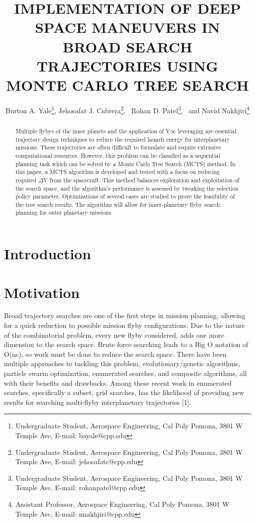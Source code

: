 \documentclass[letterpaper, preprint, paper,11pt]{AAS}	%
\begin{document}
\title{IMPLEMENTATION OF DEEP SPACE MANEUVERS IN BROAD SEARCH TRAJECTORIES USING MONTE CARLO TREE SEARCH}

\author{Burton A. Yale\thanks{Undergraduate Student, Aerospace Engineering, Cal Poly Pomona, 3801 W Temple Ave, E-mail: bayale@cpp.edu},  
Jehosafat J. Cabrera\thanks{Undergraduate Student, Aerospace Engineering, Cal Poly Pomona, 3801 W Temple Ave, E-mail: jehosafatc@cpp.edu},
\ Rohan D. Patel\thanks{Undergraduate Student, Aerospace Engineering, Cal Poly Pomona, 3801 W Temple Ave, E-mail: rohanpatel@cpp.edu},
\ and Navid Nakhjiri\thanks{Assistant Professor, Aerospace Engineering, Cal Poly Pomona, 3801 W Temple Ave, E-mail: nnakhjiri@cpp.edu}
}


\maketitle{} 		


\begin{abstract}
Multiple flybys of the inner planets and the application of V$\infty$ leveraging are essential trajectory design techniques to reduce the required launch energy for interplanetary missions. These trajectories are often difficult to formulate and require extensive computational resources. However, this problem can be classified as a sequential planning task which can be solved by a Monte Carlo Tree Search (MCTS) method. In this paper, a MCTS algorithm is developed and tested with a focus on reducing required $\Delta$V from the spacecraft. This method balances exploration and exploitation of the search space, and the algorithm’s performance is assessed by tweaking the selection policy parameter. Optimizations of several cases are studied to prove the feasibility of the tree search results. The algorithm will allow for inner-planetary flyby search planning for outer planetary missions.
\end{abstract}

\section{Introduction}

\section{Motivation}

Broad trajectory searches are one of the first steps in mission planning, allowing for a quick reduction to possible mission flyby configurations. Due to the nature of the combinatorial problem, every new flyby considered, adds one more dimension to the search space. Brute force searching leads to a Big O notation of O(nc), so work must be done to reduce the search space. There have been multiple approaches to tackling this problem, evolutionary/genetic algorithms, particle swarm optimization, enumerated searches, and composite algorithms, all with their benefits and drawbacks. Among these recent work in enumerated searches, specifically a subset, grid searches, has the likelihood of providing new results for searching multi-flyby interplanetary trajectories [1]. 
\end{document}
